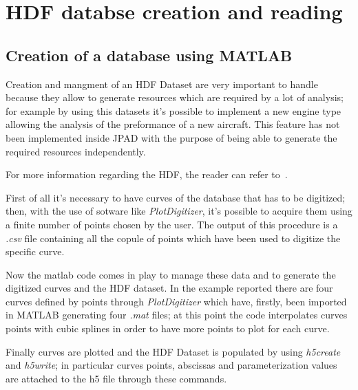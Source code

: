 %
%
\chapter{HDF databse creation and reading }
\label{ch:hdf}

\section{Creation of a database using MATLAB}\label{par:Appendix1}
Creation and mangment of an HDF Dataset are very important to handle because they allow to generate resources which are required by a lot of analysis; for example by using this datasets it's possible to implement a new engine type allowing the analysis of the preformance of a new aircraft. 
This feature has not been implemented inside JPAD with the purpose of being able to generate the required resources independently.

For more information regarding the \gls{HDF}, the reader can refer to~\cite{hdf}.

\bigskip
\noindent
First of all it's necessary to have curves of the database that has to be digitized; then, with the use of sotware like \emph{PlotDigitizer}, it's possible to acquire them using a finite number of points chosen by the user.
The output of this procedure is a \emph{.csv} file containing all the copule of points which have been used to digitize the specific curve.

Now the matlab code comes in play to manage these data and to generate the digitized curves and the HDF dataset. 
In the example reported there are four curves defined by points through \emph{PlotDigitizer} which have, firstly, been imported in MATLAB generating four \emph{.mat} files; at this point the code interpolates curves points with cubic splines in order to have more points to plot for each curve.

Finally curves are plotted and the HDF Dataset is populated by using \emph{h5create} and \emph{h5write}; in particular curves points, abscissas and parameterization values are attached to the h5 file through these commands.

